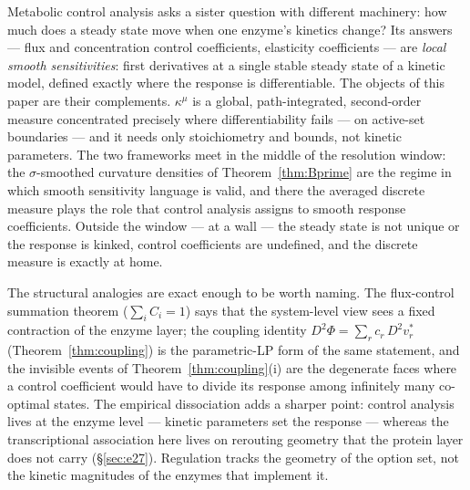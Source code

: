 \documentclass[11pt,a4paper]{article}
\theoremstyle{plain}
\theoremstyle{definition}
\theoremstyle{remark}
\newcommand{\kmu}{\kappa^{\mu}}
\begin{document}
Metabolic control analysis \citep{kacser1973, heinrich1974} asks a
sister question with different machinery: how much does a
steady state move when one enzyme's kinetics change? Its answers
--- flux and concentration control coefficients, elasticity
coefficients --- are \emph{local smooth sensitivities}: first
derivatives at a single stable steady state of a kinetic model,
defined exactly where the response is differentiable. The objects
of this paper are their complements. $\kmu$ is a global,
path-integrated, second-order measure concentrated precisely where
differentiability fails --- on active-set boundaries --- and it
needs only stoichiometry and bounds, not kinetic parameters. The
two frameworks meet in the middle of the resolution window: the
$\sigma$-smoothed curvature densities of Theorem~\ref{thm:Bprime}
are the regime in which smooth sensitivity language is valid, and
there the averaged discrete measure plays the role that control
analysis assigns to smooth response coefficients. Outside the
window --- at a wall --- the steady state is not unique or the
response is kinked, control coefficients are undefined, and the
discrete measure is exactly at home.

The structural analogies are exact enough to be worth naming. The
flux-control summation theorem ($\sum_i C_i = 1$) says that the
system-level view sees a fixed contraction of the enzyme layer;
the coupling identity $D^2\Phi = \sum_r c_r\,D^2 v^*_r$
(Theorem~\ref{thm:coupling}) is the parametric-LP form of the same
statement, and the invisible events of
Theorem~\ref{thm:coupling}(i) are the degenerate faces where a
control coefficient would have to divide its response among
infinitely many co-optimal states. The empirical dissociation adds
a sharper point: control analysis lives at the enzyme level ---
kinetic parameters set the response --- whereas the transcriptional
association here lives on rerouting geometry that the protein
layer does not carry (\S\ref{sec:e27}). Regulation tracks the
geometry of the option set, not the kinetic magnitudes of the
enzymes that implement it.
\end{document}
